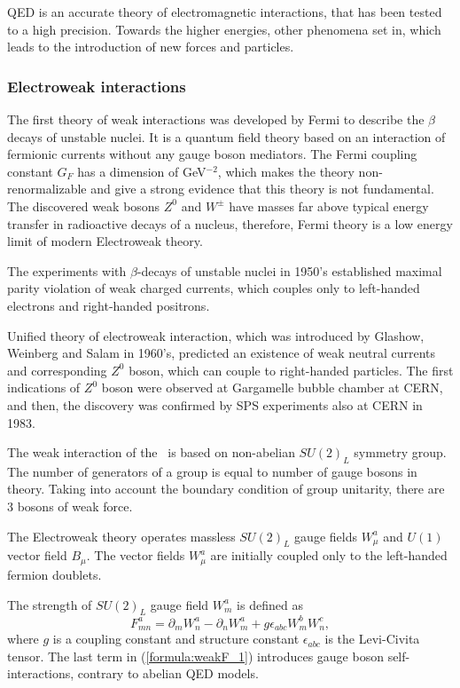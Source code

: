 QED is an accurate theory of electromagnetic interactions, that has been tested to a high precision. 
Towards the higher energies, other phenomena set in, which leads to the introduction of new forces and particles. 

\subsubsection{Electroweak interactions}
\label{sec:EWT_SM}
The first theory of weak interactions was developed by Fermi to describe the $\beta$ decays of unstable nuclei. It is a  quantum field theory based on an interaction of fermionic currents without any gauge boson mediators. The Fermi coupling constant $G_F$ has a dimension of GeV$^{-2}$, which makes the theory non-renormalizable and give a strong evidence that this theory is not fundamental. The discovered weak bosons $Z^0$ and $W^\pm$ have masses far above typical energy transfer in radioactive decays of a nucleus, therefore, Fermi theory is a low energy limit of modern Electroweak theory.

The experiments with $\beta$-decays of unstable nuclei in 1950's established maximal parity violation of weak charged currents, which couples only to left-handed electrons and right-handed positrons. 

Unified theory of electroweak interaction, which was introduced by Glashow, Weinberg and Salam in 1960's, predicted an existence of weak neutral currents and corresponding $Z^0$ boson, which can couple to right-handed particles. 
The first indications of $Z^0$ boson were observed at Gargamelle bubble chamber at CERN, and then, the discovery was confirmed by SPS experiments also at CERN in 1983. 

The weak interaction of the \sm\ is based on non-abelian $SU(2)_L$ symmetry group. The number of generators of a group is equal to number of gauge bosons in theory. Taking into account the boundary condition of group unitarity, there are 3 bosons of weak force. 

The Electroweak theory operates massless $SU(2)_L$ gauge fields $W^a_\mu$ and $U(1)$ vector field $B_\mu$. The vector fields $W^a_\mu$ are initially coupled only to the left-handed fermion doublets.

The strength of $SU(2)_L$ gauge field $W_m^a$ is defined as
\begin{equation}
	F_{mn}^a =  \partial_m W_n^a - \partial_n W_m^a + g \epsilon_{abc}W_m^b W_n^c,
    \label{formula:weakF_1}
\end{equation}
where $g$ is a coupling constant and structure constant $\epsilon_{abc}$ is the Levi-Civita tensor. The last term in (\ref{formula:weakF_1}) introduces gauge boson self-interactions, contrary to abelian QED models. 

